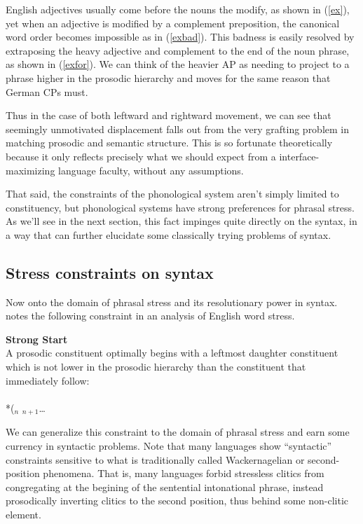 \documentclass{article}
\begin{document}
English adjectives usually come before the nouns the modify, as shown in (\ref{ex}), yet when an adjective is modified by a complement preposition, the canonical word order becomes impossible as in (\ref{exbad}). This badness is easily resolved by extraposing the heavy adjective and complement to the end of the noun phrase, as shown in (\ref{exfor}). We can think of the heavier AP as needing to project to a phrase higher in the prosodic hierarchy and moves for the same reason that German CPs must.

Thus in the case of both leftward and rightward movement, we can see that seemingly unmotivated displacement falls out from the very grafting problem in matching prosodic and semantic structure. This is so fortunate theoretically because it only reflects precisely what we should expect from a interface-maximizing language faculty, without any assumptions.

That said, the constraints of the phonological system aren't simply limited to constituency, but phonological systems have strong preferences for phrasal stress. As we'll see in the next section, this fact impinges quite directly on the syntax, in a way that can further elucidate some classically trying problems of syntax.

\subsection{Stress constraints on syntax}


Now onto the domain of phrasal stress and its resolutionary power in syntax. \citet{selkirk11} notes the following constraint in an analysis of English word stress.

\begin{exe}
\ex \textbf{Strong Start} \citep{selkirk11}\\A prosodic constituent optimally begins with a leftmost daughter constituent which is not lower in the prosodic hierarchy than the constituent that immediately follow:\\\\{*}(\textpi$_n$ \textpi$_{n+1}$\ldots
\end{exe}

We can generalize this constraint to the domain of phrasal stress and earn some currency in syntactic problems. Note that many languages show ``syntactic'' constraints sensitive to what is traditionally called Wackernagelian or second-position phenomena. That is, many languages forbid stressless clitics from congregating at the begining of the sentential intonational phrase, instead prosodically inverting clitics to the second position, thus behind some non-clitic element.
\end{document}
